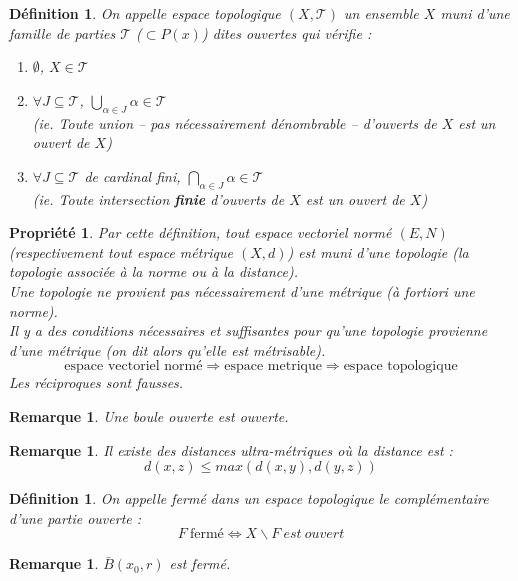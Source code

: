 \documentclass[a4paper, oneside]{report}
\theoremstyle{break}
\newtheorem{defi}[thm]{Définition}
\newtheorem{propr}[thm]{Propriété}
\newtheorem{remar}[thm]{Remarque}
\newcommand{\evn}{espace vectoriel normé }
\begin{document}
\begin{defi}
On appelle espace topologique $(X, \mathcal{T})$ un ensemble $X$ muni d'une famille de parties $\mathcal{T}$ ($\subset P(x)$) dites ouvertes qui vérifie :
\begin{enumerate}
\item $\emptyset$, $X\in \mathcal{T}$
\item $\forall J\subseteq \mathcal{T}$, $\bigcup_{\alpha \in J}\alpha \in \mathcal{T}$ \\
  (ie. Toute union -- pas nécessairement dénombrable -- d'ouverts de $X$ est un ouvert de $X$)
\item $\forall J \subseteq \mathcal{T}$ de cardinal fini, $\bigcap_{\alpha\in J}\alpha\in \mathcal{T}$ \\
  (ie. Toute intersection \textbf{finie} d'ouverts de $X$ est un ouvert de $X$)
\end{enumerate}
\end{defi}

\begin{propr}
Par cette définition, tout \evn $(E, N)$ (respectivement tout espace métrique $(X,d)$) est muni d'une topologie (la topologie associée à la norme ou à la distance).\\
Une topologie ne provient pas nécessairement d'une métrique (à fortiori une norme).\\
Il y a des conditions nécessaires et suffisantes pour qu'une topologie provienne d'une métrique (on dit alors qu'elle est métrisable).
$$ \text{espace vectoriel normé} \Rightarrow \text{espace metrique} \Rightarrow \text{espace topologique}$$
Les réciproques sont fausses.
\end{propr}

\begin{remar}
Une boule ouverte est ouverte.
\end{remar}


\begin{remar}
Il existe des distances ultra-métriques où la distance est :
$$d(x,z)\leq max(d(x,y),d(y,z))$$
\end{remar}


\begin{defi}
On appelle fermé dans un espace topologique le complémentaire d'une partie ouverte :
$$F~\text{fermé} \Leftrightarrow X\backslash F~est~ouvert$$
\end{defi}

\begin{remar}
$\bar{B}(x_0,r)$ est fermé.
\end{remar}
\end{document}
